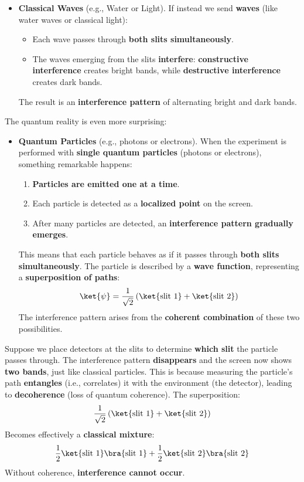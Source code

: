 \begin{enumerate}
\begin{itemize}
        \item \textbf{Classical Waves} (e.g., Water or Light). If instead we send \textbf{waves} (like water waves or classical light):
        \begin{itemize}
            \item Each wave passes through \textbf{both slits simultaneously}.
            \item The waves emerging from the slits \textbf{interfere}: \textbf{constructive interference} creates bright bands, while \textbf{destructive interference} creates dark bands.
        \end{itemize}
        The result is an \textbf{interference pattern} of alternating bright and dark bands.
    \end{itemize}
    The quantum reality is even more surprising:
    \begin{itemize}
        \item \textbf{Quantum Particles} (e.g., photons or electrons). When the experiment is performed with \textbf{single quantum particles} (photons or electrons), something remarkable happens:
        \begin{enumerate}
            \item \textbf{Particles are emitted one at a time}.
            \item Each particle is detected as a \textbf{localized point} on the screen.
            \item After many particles are detected, an \textbf{interference pattern gradually emerges}.
        \end{enumerate}
        This means that each particle behaves as if it passes through \textbf{both slits simultaneously}. The particle is described by a \textbf{wave function}, representing a \textbf{superposition of paths}:
        \begin{equation*}
            \ket{\psi} = \frac{1}{\sqrt{2}}\left(\ket{\text{slit 1}} + \ket{\text{slit 2}}\right)
        \end{equation*}
        The interference pattern arises from the \textbf{coherent combination} of these two possibilities.
    \end{itemize}
    Suppose we place detectors at the slits to determine \textbf{which slit} the particle passes through. The interference pattern \textbf{disappears} and the screen now shows \textbf{two bands}, just like classical particles. This is because measuring the particle's path \textbf{entangles} (i.e., correlates) it with the environment (the detector), leading to \textbf{decoherence} (loss of quantum coherence). The superposition:
    \begin{equation*}
        \frac{1}{\sqrt{2}}\left(\ket{\text{slit 1}} + \ket{\text{slit 2}}\right)
    \end{equation*}
    Becomes effectively a \textbf{classical mixture}:
    \begin{equation*}
        \frac{1}{2}\ket{\text{slit 1}}\bra{\text{slit 1}} + \frac{1}{2}\ket{\text{slit 2}}\bra{\text{slit 2}}
    \end{equation*}
    Without coherence, \textbf{interference cannot occur}.
    

\end{enumerate}
